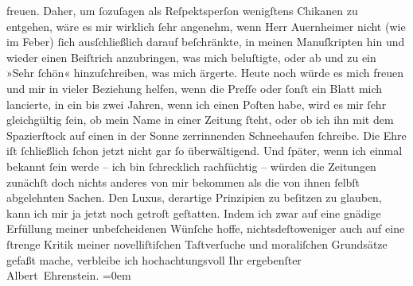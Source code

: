 \begin{ledgroupsized}[t]{13cm}
               freuen. Daher, um ſozuſagen als Reſpektsperſon wenigſtens Chikanen zu entgehen, wäre
               es mir wirklich ſehr angenehm, wenn Herr Auernheimer nicht (wie im Feber) ſich ausſchließlich darauf
               beſchränkte, in meinen Manuſkripten hin und wieder einen Beiſtrich anzubringen, was
               mich beluſtigte, oder ab und zu ein »Sehr ſchön« hinzuſchreiben, was mich ärgerte.
               Heute noch würde es mich freuen und mir in vieler Beziehung helfen, wenn die Preſſe oder ſonſt ein Blatt mich lancierte, in ein
               bis zwei Jahren, wenn ich einen Poſten habe, wird es mir ſehr gleichgültig ſein, ob
               mein Name in einer Zeitung ſteht, oder ob ich ihn mit dem Spazierſtock auf einen in
               der Sonne zerrinnenden Schneehaufen ſchreibe. {\pb}Die Ehre iſt ſchließlich ſchon jetzt nicht
               gar ſo überwältigend. Und ſpäter, wenn ich einmal bekannt ſein werde – ich bin
               ſchrecklich rachſüchtig – würden die Zeitungen zunächſt doch nichts anderes von mir
               bekommen als die von ihnen ſelbſt abgelehnten Sachen. Den Luxus, derartige Prinzipien
                  \introOben{}zu\introOben{} beſitzen zu glauben, kann ich mir ja jetzt noch
               getroſt geſtatten.\pend
           \pstart
           Indem ich zwar auf eine gnädige Erfüllung meiner \introOben{}unbeſcheidenen\introOben{} Wünſche hoffe, nichtsdeſtoweniger auch auf eine ſtrenge
               Kritik meiner novelliſtiſchen Taſtverſuche und moraliſchen Grundsätze gefaßt mache,
               verbleibe ich hochachtungsvoll\pend
           \pstart
           Ihr ergebenſter{\\[\baselineskip]}\spacefill\mbox{Albert Ehrenstein.}\pend
           \leftskip=0em{}
         
         \endnumbering{}\end{ledgroupsized}  \newcommand{\dateiname}{L01857}\newcommand{\titel}{Albert Ehrenstein an Arthur Schnitzler, 13. 7. 1909}\newcommand{\editorInnen}{Martin Anton Müller und Gerd-Hermann Susen}
      